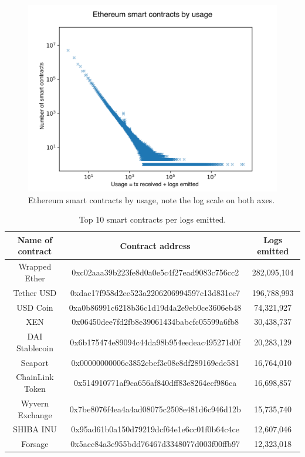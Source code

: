 \begin{figure}[!ht]
    \centering
    \includegraphics[width=1\textwidth]{Figures/analysis/contracts_by_usage.png}
    \caption{Ethereum smart contracts by usage, note the log scale on both axes.}
    \label{fig:contracts-by-usage}
\end{figure}

\begin{table}[!ht]
\centering
    \begin{threeparttable}
    \begin{tabular}{ c c c } 
    \toprule
    \textbf{Name of contract} & \textbf{Contract address} & \textbf{Logs emitted} \\
    \midrule
       Wrapped Ether & \small{0xc02aaa39b223fe8d0a0e5c4f27ead9083c756cc2} & 282,095,104  \\ [1.2ex]
       Tether USD  & \small{0xdac17f958d2ee523a2206206994597c13d831ec7} & 196,788,993  \\ [1.2ex]
       USD Coin & \small{0xa0b86991c6218b36c1d19d4a2e9eb0ce3606eb48} & 74,321,927  \\ [1.2ex]
       XEN & \small{0x06450dee7fd2fb8e39061434babcfc05599a6fb8} & 30,438,737  \\ [1.2ex]
       DAI Stablecoin& \small{0x6b175474e89094c44da98b954eedeac495271d0f} & 20,283,129  \\ [1.2ex]
       Seaport & \small{0x00000000006c3852cbef3e08e8df289169ede581} & 16,764,010  \\ [1.2ex]
       ChainLink Token & \small{0x514910771af9ca656af840dff83e8264ecf986ca} & 16,698,857  \\ [1.2ex]
       Wyvern Exchange & \small{0x7be8076f4ea4a4ad08075c2508e481d6c946d12b} & 15,735,740  \\ [1.2ex]
       SHIBA INU & \small{0x95ad61b0a150d79219dcf64e1e6cc01f0b64c4ce} & 12,607,046  \\ [1.2ex]
       Forsage & \small{0x5acc84a3e955bdd76467d3348077d003f00ffb97} & 12,323,018  \\ [1.2ex]  
    \bottomrule
    \end{tabular}
    \end{threeparttable}
    \caption{Top 10 smart contracts per logs emitted.}
    \label{table:top-logs-emitters}
\end{table}

